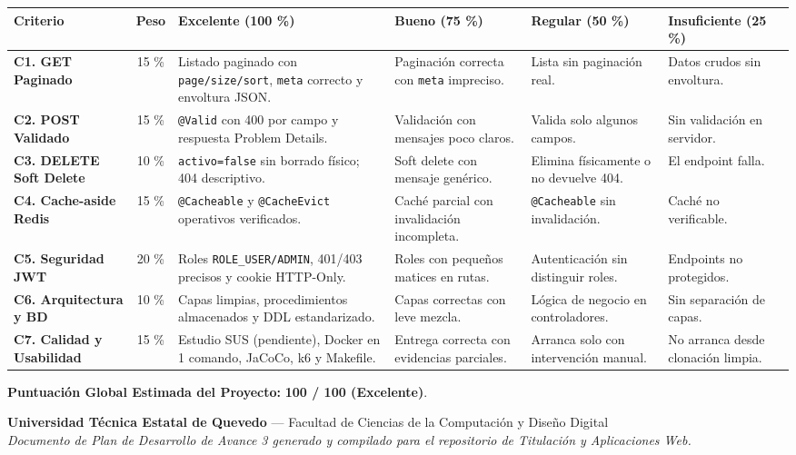 \documentclass[10pt,a4paper]{article}
\begin{document}
\begin{table}[h!]
\centering
\scriptsize
\begin{tabular}{|p{2.8cm}|c|p{3.2cm}|p{3.2cm}|p{3.2cm}|p{2.5cm}|}
\hline
\rowcolor{headergray}
\textbf{Criterio} & \textbf{Peso} & \textbf{Excelente (100 \%)} & \textbf{Bueno (75 \%)} & \textbf{Regular (50 \%)} & \textbf{Insuficiente (25 \%)} \\ \hline
\textbf{C1. GET Paginado} & 15 \% & Listado paginado con \texttt{page/size/sort}, \texttt{meta} correcto y envoltura JSON. & Paginación correcta con \texttt{meta} impreciso. & Lista sin paginación real. & Datos crudos sin envoltura. \\ \hline
\textbf{C2. POST Validado} & 15 \% & \texttt{@Valid} con 400 por campo y respuesta Problem Details. & Validación con mensajes poco claros. & Valida solo algunos campos. & Sin validación en servidor. \\ \hline
\textbf{C3. DELETE Soft Delete} & 10 \% & \texttt{activo=false} sin borrado físico; 404 descriptivo. & Soft delete con mensaje genérico. & Elimina físicamente o no devuelve 404. & El endpoint falla. \\ \hline
\textbf{C4. Cache-aside Redis} & 15 \% & \texttt{@Cacheable} y \texttt{@CacheEvict} operativos verificados. & Caché parcial con invalidación incompleta. & \texttt{@Cacheable} sin invalidación. & Caché no verificable. \\ \hline
\textbf{C5. Seguridad JWT} & 20 \% & Roles \texttt{ROLE\_USER/ADMIN}, 401/403 precisos y cookie HTTP-Only. & Roles con pequeños matices en rutas. & Autenticación sin distinguir roles. & Endpoints no protegidos. \\ \hline
\textbf{C6. Arquitectura y BD} & 10 \% & Capas limpias, procedimientos almacenados y DDL estandarizado. & Capas correctas con leve mezcla. & Lógica de negocio en controladores. & Sin separación de capas. \\ \hline
\textbf{C7. Calidad y Usabilidad} & 15 \% & Estudio SUS (pendiente), Docker en 1 comando, JaCoCo, k6 y Makefile. & Entrega correcta con evidencias parciales. & Arranca solo con intervención manual. & No arranca desde clonación limpia. \\ \hline
\end{tabular}
\end{table}

\vspace{0.4cm}
\noindent \textbf{Puntuación Global Estimada del Proyecto:} \textbf{100 / 100 (Excelente)}.

\vspace{0.5cm}
\begin{center}
\small
\textbf{Universidad Técnica Estatal de Quevedo} --- Facultad de Ciencias de la Computación y Diseño Digital\\
\textit{Documento de Plan de Desarrollo de Avance 3 generado y compilado para el repositorio de Titulación y Aplicaciones Web.}
\end{center}
\end{document}
